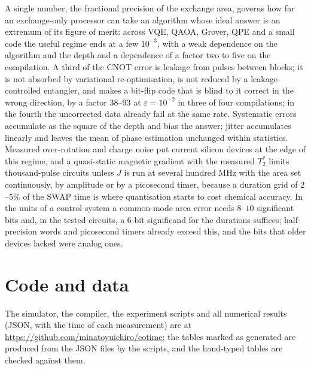\documentclass[reprint,aps,pra,amsmath,amssymb,superscriptaddress,letterpaper]{revtex4-2}
\begin{document}
A single number, the fractional precision of the exchange area, governs how
far an exchange-only processor can take an algorithm whose ideal answer is an
extremum of its figure of merit: across VQE, QAOA, Grover, QPE and a small
code the useful regime ends at a few $10^{-3}$, with a weak dependence on the algorithm and the depth and a dependence of a factor two to five on the compilation. A
third of the CNOT error is leakage from pulses between blocks; it is not
absorbed by variational re-optimisation, is not reduced by a leakage-controlled entangler, and makes a bit-flip code that is blind to it correct in the wrong direction, by a factor $38$--$93$ at $\varepsilon=10^{-2}$ in three of four compilations; in the fourth the uncorrected data already fail at the same rate. Systematic errors accumulate as the square of the depth
and bias the answer; jitter accumulates linearly and leaves the mean of phase estimation unchanged within statistics. Measured over-rotation and charge noise put current silicon devices
at the edge of this regime, and a quasi-static magnetic gradient with the
measured $T_2^*$ limits thousand-pulse circuits unless $J$ is run at several hundred MHz with the area set continuously, by amplitude or by a picosecond timer, because a duration grid of $2$--$5\%$ of the SWAP time is where quantisation starts to cost chemical accuracy. In the units of a control system a common-mode area error needs $8$--$10$ significant bits and, in the tested circuits, a $6$-bit significand for the durations suffices; half-precision words and picosecond timers already exceed this, and the bits that older devices lacked were analog ones.

\section*{Code and data}

The simulator, the compiler, the experiment scripts and all numerical results
(JSON, with the time of each measurement) are at
\url{https://github.com/minatoyuichiro/eotime}; the tables marked as generated are produced from the JSON files by the scripts, and the hand-typed tables are checked against them.



\end{document}
